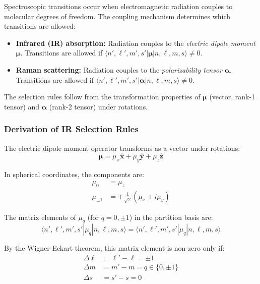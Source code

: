 \documentclass[twocolumn,10pt]{article}
\theoremstyle{remark}
\begin{document}
Spectroscopic transitions occur when electromagnetic radiation couples to molecular degrees of freedom. The coupling mechanism determines which transitions are allowed:

\begin{itemize}
    \item \textbf{Infrared (IR) absorption:} Radiation couples to the \textit{electric dipole moment} $\boldsymbol{\mu}$. Transitions are allowed if $\langle n', \ell', m', s' | \boldsymbol{\mu} | n, \ell, m, s \rangle \neq 0$.

    \item \textbf{Raman scattering:} Radiation couples to the \textit{polarizability tensor} $\boldsymbol{\alpha}$. Transitions are allowed if $\langle n', \ell', m', s' | \boldsymbol{\alpha} | n, \ell, m, s \rangle \neq 0$.
\end{itemize}

The selection rules follow from the transformation properties of $\boldsymbol{\mu}$ (vector, rank-1 tensor) and $\boldsymbol{\alpha}$ (rank-2 tensor) under rotations.

\subsubsection{Derivation of IR Selection Rules}

The electric dipole moment operator transforms as a vector under rotations:
\begin{equation}
    \boldsymbol{\mu} = \mu_x \hat{\mathbf{x}} + \mu_y \hat{\mathbf{y}} + \mu_z \hat{\mathbf{z}}
    \label{eq:dipole_operator}
\end{equation}

In spherical coordinates, the components are:
\begin{align}
    \mu_0 &= \mu_z \label{eq:dipole_z} \\
    \mu_{\pm 1} &= \mp \frac{1}{\sqrt{2}}(\mu_x \pm i\mu_y) \label{eq:dipole_pm}
\end{align}

The matrix elements of $\mu_q$ (for $q = 0, \pm 1$) in the partition basis are:
\begin{equation}
    \langle n', \ell', m', s' | \mu_q | n, \ell, m, s \rangle = \langle n', \ell', m', s' | \mu_q | n, \ell, m, s \rangle
    \label{eq:dipole_matrix_element}
\end{equation}

By the Wigner-Eckart theorem, this matrix element is non-zero only if:
\begin{align}
    \Delta \ell &= \ell' - \ell = \pm 1 \label{eq:IR_selection_l} \\
    \Delta m &= m' - m = q \in \{0, \pm 1\} \label{eq:IR_selection_m} \\
    \Delta s &= s' - s = 0 \label{eq:IR_selection_s}
\end{align}
\end{document}
